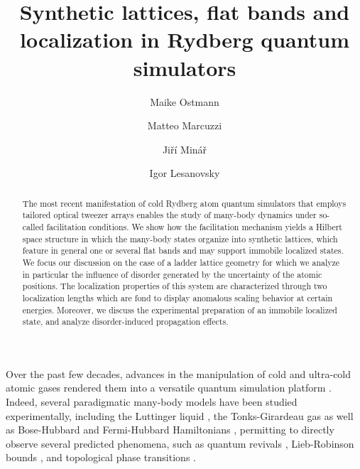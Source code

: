 \documentclass[prl,aps,twocolumn,showpacs,superscriptaddress,longbibliography]{revtex4-1}
\begin{document}
\title{Synthetic lattices, flat bands and localization in Rydberg quantum simulators}

\author{Maike Ostmann}
\author{Matteo Marcuzzi}
\author{Ji\v{r}\'{i} Min\'{a}\v{r}}
\author{Igor Lesanovsky}



\begin{abstract}
The most recent manifestation of cold Rydberg atom quantum simulators that employs tailored optical tweezer arrays enables the study of many-body dynamics under so-called facilitation conditions. We show how the facilitation mechanism yields a Hilbert space structure in which the many-body states organize into synthetic lattices, which feature in general one or several flat bands and may support immobile localized states. We focus our discussion on the case of a ladder lattice geometry for which we analyze in particular the influence of disorder generated by the uncertainty of the atomic positions. The localization properties of this system are characterized through two localization lengths which are fond to display anomalous scaling behavior at certain energies. Moreover, we discuss the experimental preparation of an immobile localized state, and analyze disorder-induced propagation effects.
\end{abstract}
\pacs{}
\maketitle


Over the past few decades, advances in the manipulation of cold and ultra-cold atomic gases rendered them into a versatile quantum simulation platform \cite{Bloch_2008,Bloch_2012}. Indeed, several paradigmatic many-body models have been studied experimentally, including the Luttinger liquid \cite{hofferberth2007}, the Tonks-Girardeau gas \cite{kinoshita2004} as well as Bose-Hubbard \cite{greiner2002, greiner2003} and Fermi-Hubbard Hamiltonians \cite{Kohl2005}, permitting to directly observe several predicted phenomena, such as quantum revivals \cite{greiner2002_revival}, Lieb-Robinson bounds \cite{cheneau2012}, and topological phase transitions \cite{hadzibabic2006}.
\end{document}
